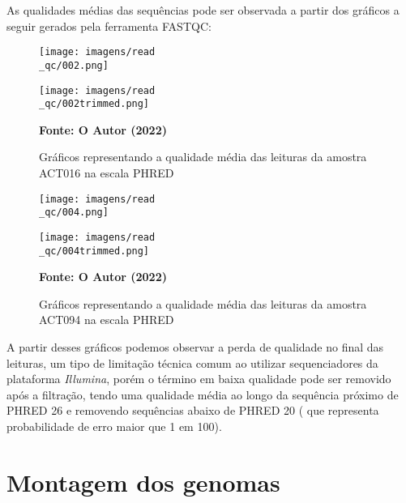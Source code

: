 As qualidades médias das sequências pode ser observada a partir dos gráficos a seguir gerados pela ferramenta FASTQC:
\page
\begin{figure}[H]
	\caption{Gráficos representando a qualidade média das leituras da amostra ACT016 na escala PHRED}
	\label{fig:fastqc_antes}
	\centering
	\begin{minipage}{.45\linewidth}
		\texttt{[image: imagens/read\\\_qc/002.png]}
	  \end{minipage}
	  \hspace{.05\linewidth}
	  \begin{minipage}{.45\linewidth}
		\texttt{[image: imagens/read\\\_qc/002trimmed.png]}
	  \end{minipage}
    \begin{small}\textbf{Fonte: O Autor (2022)}\end{small}
\end{figure}
\vspace{\floatsep}
\begin{figure}[H]
	\caption{Gráficos representando a qualidade média das leituras da amostra ACT094 na escala PHRED}
	\label{fig:fastqc_antes}
	\centering
	\begin{minipage}{.45\linewidth}
		\texttt{[image: imagens/read\\\_qc/004.png]}
	  \end{minipage}
	  \hspace{.01\linewidth}
	  \begin{minipage}{.45\linewidth}
		\texttt{[image: imagens/read\\\_qc/004trimmed.png]}
	  \end{minipage}
    \begin{small}\textbf{Fonte: O Autor (2022)}\end{small}
\end{figure}
\vspace{\floatsep}

A partir desses gráficos podemos observar a perda de qualidade no final das leituras, um tipo de limitação
técnica comum ao utilizar sequenciadores da plataforma \textit{Illumina}, porém o término em baixa qualidade
pode ser removido após a filtração, tendo uma qualidade média ao longo da sequência próximo de PHRED 26 e
removendo sequências abaixo de PHRED 20 ( que representa probabilidade de erro maior que 1 em 100).


\section{Montagem dos genomas}

